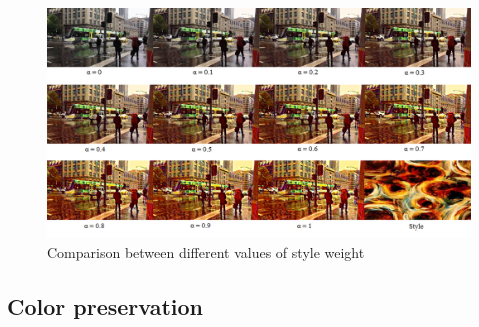 \documentclass[../Main.tex]{subfiles}
\begin{document}
\begin{figure}[h!]
    \centering
    \includegraphics[scale=0.75]{Images/style1.png}
    \caption{Comparison between different values of style weight}
    \label{fig:style1}
\end{figure}

\subsection{Color preservation}
\end{document}
